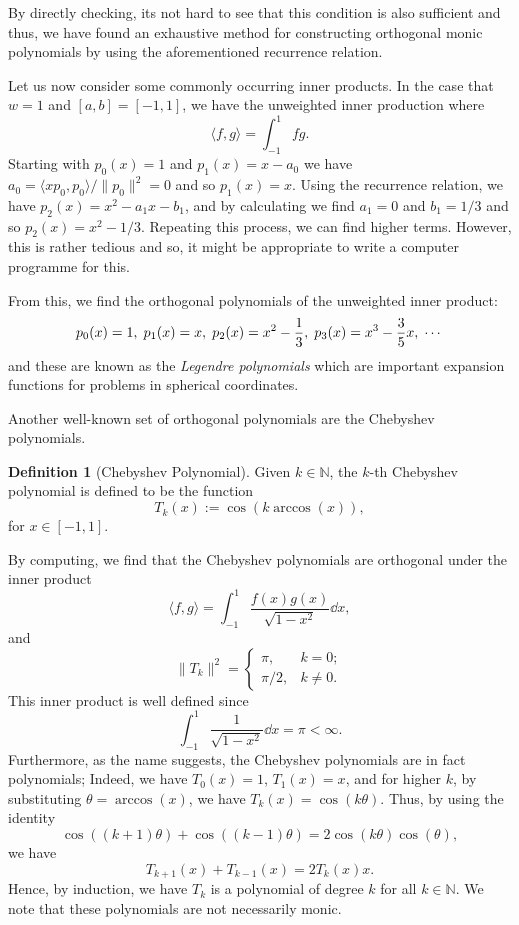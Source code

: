 \documentclass[
]{article}
\theoremstyle{definition}
\theoremstyle{definition}
\newtheorem{definition}{Definition}[section]
\begin{document}
By directly checking, its not hard to see that this condition is also
sufficient and thus, we have found an exhaustive method for constructing
orthogonal monic polynomials by using the aforementioned recurrence
relation.

Let us now consider some commonly occurring inner products. In the case
that \(w = 1\) and \([a, b] = [-1, 1]\), we have the unweighted inner
production where \[\langle f, g \rangle = \int_{-1}^1 fg.\] Starting
with \(p_0(x) = 1\) and \(p_1(x) = x - a_0\) we have
\(a_0 = \langle xp_0, p_0 \rangle / \|p_0\|^2 = 0\) and so
\(p_1(x) = x\). Using the recurrence relation, we have
\(p_2(x) = x^2 - a_1 x - b_1\), and by calculating we find \(a_1 = 0\)
and \(b_1 = 1 / 3\) and so \(p_2(x) = x^2 - 1 / 3\). Repeating this
process, we can find higher terms. However, this is rather tedious and
so, it might be appropriate to write a computer programme for this.

From this, we find the orthogonal polynomials of the unweighted inner
product:
\[p_0(x) = 1,\hspace{1mm} p_1(x) = x,\hspace{1mm} p_2(x) = x^2 - \frac{1}{3},\hspace{1mm} 
  p_3(x) = x^3 - \frac{3}{5}x,\hspace{1mm} \cdots\] and these are known
as the \emph{Legendre polynomials} which are important expansion
functions for problems in spherical coordinates.

Another well-known set of orthogonal polynomials are the Chebyshev
polynomials.

\begin{definition}[Chebyshev Polynomial]
  Given \(k \in \mathbb{N}\), the \(k\)-th Chebyshev polynomial is defined to be 
  the function 
  \[T_k(x) := \cos(k \arccos (x)),\]
  for \(x \in [-1, 1]\).
\end{definition}

By computing, we find that the Chebyshev polynomials are orthogonal
under the inner product
\[\langle f, g \rangle = \int_{-1}^1 \frac{f(x)g(x)}{\sqrt{1 - x^2}} \dd x,\]
and \[\|T_k\|^2 = 
  \begin{cases}
    \pi, & k = 0;\\
    \pi / 2, & k \neq 0.
  \end{cases}\] This inner product is well defined since
\[\int_{-1}^1 \frac{1}{\sqrt{1 - x^2}} \dd x = \pi < \infty.\]
Furthermore, as the name suggests, the Chebyshev polynomials are in fact
polynomials; Indeed, we have \(T_0(x) = 1\), \(T_1(x) = x\), and for
higher \(k\), by substituting \(\theta = \arccos(x)\), we have
\(T_k(x) = \cos(k \theta)\). Thus, by using the identity
\[\cos((k + 1) \theta) + \cos((k - 1)\theta) = 2\cos(k\theta)\cos(\theta),\]
we have \[T_{k + 1}(x) + T_{k - 1}(x) = 2T_k(x)x.\] Hence, by induction,
we have \(T_k\) is a polynomial of degree \(k\) for all
\(k \in \mathbb{N}\). We note that these polynomials are not necessarily
monic.
\end{document}
